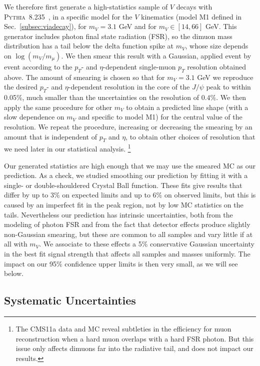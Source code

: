 \documentclass[aps,prd,twocolumn,superscriptaddress,preprintnumbers,nofootinbib,longbibliography,floatfix]{revtex4-1}
\DeclareRobustCommand{\Sec}[1]{Sec.~\ref{#1}}
\begin{document}
We therefore first generate a high-statistics sample of $V$ decays with \textsc{Pythia}~8.235~\cite{Sjostrand:2014zea}, in a specific model for the $V$ kinematics (model M1 defined in \Sec{subsec:viadecay}),  for $m_V=3.1$ GeV and for $m_V\in[14,66]$ GeV.
%
This generator includes photon final state radiation (FSR), so the dimuon mass distribution has a tail below the delta function spike at $m_V$, whose size depends on $\log(m_V/m_{\mu})$.
%
We then smear this result with a Gaussian, applied event by event according to the $p_T$- and $\eta$-dependent single-muon $p_T$ resolution obtained above. 
%
The amount of smearing is chosen so that for $m_V=3.1$ GeV we reproduce the desired $p_T$- and $\eta$-dependent resolution in the core of the $J/\psi$ peak to within 0.05\%, much smaller than the uncertainties on the resolution of $0.4\%$.
%
We then apply the same procedure for other $m_V$ to obtain a predicted line shape (with a slow dependence on $m_V$ and specific to model M1) for the central value of the resolution.
%
We repeat the procedure, increasing or decreasing the smearing by an amount that is independent of $p_T$ and $\eta$, to obtain other choices of resolution that we need later in our statistical analysis.%
%
\footnote{The CMS11a data and MC reveal subtleties in the efficiency for muon reconstruction when a hard muon overlaps with a hard FSR photon. But this issue only affects dimuons far into the radiative tail, and does not impact our results.} 

Our generated statistics are high enough that we may use the smeared MC as our prediction.
%
As a check, we studied smoothing our prediction by fitting it with a single- or double-shouldered Crystal Ball function.
%
These fits give results that differ by up to 3\% on expected limits and up to 6\% on observed limits, but this is caused by an imperfect fit in the peak region, not by low MC statistics on the tails.
%
Nevertheless our prediction has intrinsic uncertainties, both from the modeling of photon FSR and from the fact that detector effects produce slightly non-Gaussian smearing, but these are common to all samples and vary little if at all with $m_V$.
%
We  associate to these effects a  5\% conservative Gaussian uncertainty in the best fit signal strength that affects all samples and masses uniformly.
%
The impact on our 95\% confidence upper limits is then very small, as we will see below.





\subsection{Systematic Uncertainties}
\label{subsec:systematics}
\end{document}
